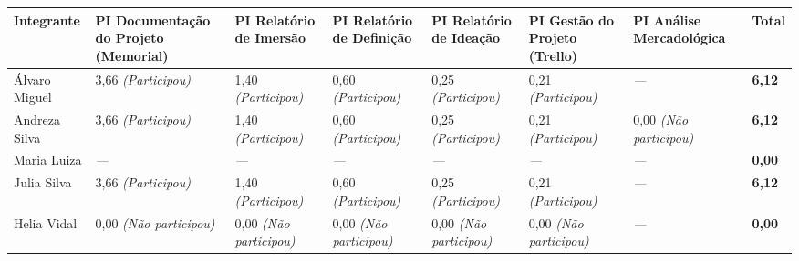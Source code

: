 \documentclass[
  sigconf,
  nonacm, %
  language=portuguese
]{acmart}
\begin{document}
\begin{tabularx}{\linewidth}{@{} X X X X X X X p{2.5cm} @{}}
\toprule
\textbf{Integrante} & \textbf{\small PI Documentação do Projeto (Memorial)} & \textbf{\small PI Relatório de Imersão} & \textbf{\small PI Relatório de Definição} & \textbf{\small PI Relatório de Ideação} & \textbf{\small PI Gestão do Projeto (Trello)} & \textbf{\small PI Análise Mercadológica} & \textbf{Total} \\
\midrule
Álvaro Miguel & 3,66 \textit{(Participou)} & 1,40 \textit{(Participou)} & 0,60 \textit{(Participou)} & 0,25 \textit{(Participou)} & 0,21 \textit{(Participou)} & \textit{---} & \textbf{6,12} \\
Andreza Silva & 3,66 \textit{(Participou)} & 1,40 \textit{(Participou)} & 0,60 \textit{(Participou)} & 0,25 \textit{(Participou)} & 0,21 \textit{(Participou)} & 0,00 \textit{(Não participou)} & \textbf{6,12} \\
Maria Luiza & \textit{---} & \textit{---} & \textit{---} & \textit{---} & \textit{---} & \textit{---} & \textbf{0,00} \\
Julia Silva & 3,66 \textit{(Participou)} & 1,40 \textit{(Participou)} & 0,60 \textit{(Participou)} & 0,25 \textit{(Participou)} & 0,21 \textit{(Participou)} & \textit{---} & \textbf{6,12} \\
Helia Vidal & 0,00 \textit{(Não participou)} & 0,00 \textit{(Não participou)} & 0,00 \textit{(Não participou)} & 0,00 \textit{(Não participou)} & 0,00 \textit{(Não participou)} & \textit{---} & \textbf{0,00} \\
\bottomrule
\end{tabularx}
\end{document}
